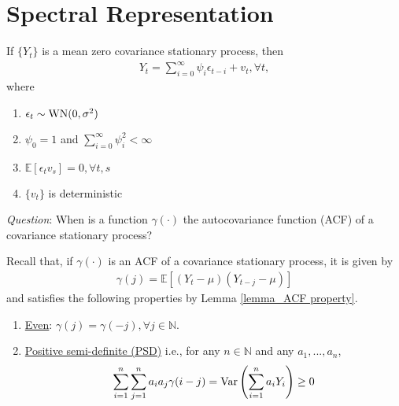 \documentclass[11pt]{elegantbook}
\begin{document}
\section{Spectral Representation}
\begin{definition}
    If $\{Y_t\}$ is a mean zero covariance stationary process, then
    \begin{equation}
        \begin{aligned}
            Y_t=\sum_{i=0}^\infty \psi_i \epsilon_{t-i} + v_t, \forall t,
        \end{aligned}
        \nonumber
    \end{equation}
    where
    \begin{enumerate}
        \item $\epsilon_t\sim \textnormal{WN}(0,\sigma^2)$
        \item $\psi_0=1$ and $\sum_{i=0}^\infty \psi_i^2<\infty$
        \item $\mathbb{E}[\epsilon_t v_s]=0, \forall t,s$
        \item $\{v_t\}$ is deterministic
    \end{enumerate}
\end{definition}


\textit{Question}:
When is a function $\gamma(\cdot)$ the autocovariance function (ACF) of a covariance stationary process?

Recall that, if $\gamma(\cdot)$ is an ACF of a covariance stationary process, it is given by
\begin{equation}
    \begin{aligned}
        \gamma(j)=\mathbb{E}[(Y_t-\mu)(Y_{t-j}-\mu)]
    \end{aligned}
    \nonumber
\end{equation}
and satisfies the following properties by Lemma \ref{lemma_ACF property}.
\begin{enumerate}
    \item \underline{Even}: $\gamma(j)=\gamma(-j),\forall j\in \mathbb{N}$.
    \item \underline{Positive semi-definite (PSD)} i.e., for any  $n\in \mathbb{N}$ and any $a_1,...,a_n$,
    \begin{equation}
        \begin{aligned}
            \sum_{i=1}^n\sum_{j=1}^na_ia_j\gamma(i-j)=\textnormal{Var}\left(\sum_{i=1}^na_iY_i\right)\geq 0
        \end{aligned}
        \nonumber
    \end{equation}
\end{enumerate}
\end{document}
